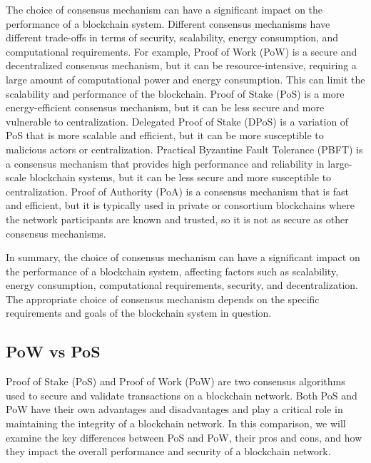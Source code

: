 \documentclass[target=mst,aauheader=]{thud}
\begin{document}
    The choice of consensus mechanism can have a significant impact on the performance of a blockchain system. Different consensus mechanisms have different trade-offs in terms of security, scalability, energy consumption, and computational requirements. For example, Proof of Work (PoW) is a secure and decentralized consensus mechanism, but it can be resource-intensive, requiring a large amount of computational power and energy consumption. This can limit the scalability and performance of the blockchain. Proof of Stake (PoS) is a more energy-efficient consensus mechanism, but it can be less secure and more vulnerable to centralization. Delegated Proof of Stake (DPoS) is a variation of PoS that is more scalable and efficient, but it can be more susceptible to malicious actors or centralization. Practical Byzantine Fault Tolerance (PBFT) is a consensus mechanism that provides high performance and reliability in large-scale blockchain systems, but it can be less secure and more susceptible to centralization. Proof of Authority (PoA) is a consensus mechanism that is fast and efficient, but it is typically used in private or consortium blockchains where the network participants are known and trusted, so it is not as secure as other consensus mechanisms.

    In summary, the choice of consensus mechanism can have a significant impact on the performance of a blockchain system, affecting factors such as scalability, energy consumption, computational requirements, security, and decentralization. The appropriate choice of consensus mechanism depends on the specific requirements and goals of the blockchain system in question.

    \subsection{PoW vs PoS}

    Proof of Stake (PoS) and Proof of Work (PoW) are two consensus algorithms used to secure and validate transactions on a blockchain network. Both PoS and PoW have their own advantages and disadvantages \cite{edChainPowvsPos} and play a critical role in maintaining the integrity of a blockchain network. In this comparison, we will examine the key differences between PoS and PoW, their pros and cons, and how they impact the overall performance and security of a blockchain network.
\end{document}
